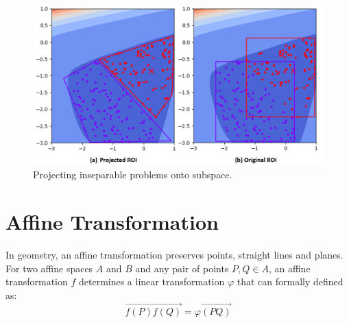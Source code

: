 \begin{figure}
\centering
\includegraphics[width=\textwidth]{Projected_ROI}
\caption{Projecting inseparable problems onto subspace.}\label{fig:Projected_ROI}
\end{figure}



\section{Affine Transformation}
In geometry, an affine transformation preserves points, straight lines and planes.
For two affine spaces $A$ and $B$ and any pair of points $P, Q \in A$,
an affine transformation $f$ determines a linear transformation $\varphi$ that can formally defined as:
\begin{displaymath}
\overrightarrow{f(P)f(Q)} = \varphi \overrightarrow{(PQ)}
\end{displaymath}


